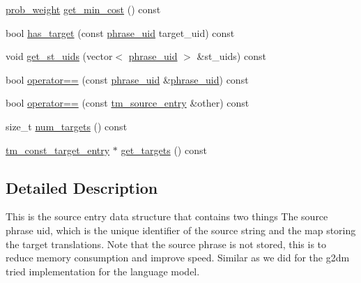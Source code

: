 \begin{DoxyCompactItemize}
\hyperlink{namespaceuva_1_1smt_1_1bpbd_1_1server_a01e9ea4de9c226f4464862e84ff0bbcc}{prob\+\_\+weight} \hyperlink{classuva_1_1smt_1_1bpbd_1_1server_1_1tm_1_1models_1_1tm__source__entry_aadb4fff504fa475f6df4b1c4f83307b4}{get\+\_\+min\+\_\+cost} () const 
\item 
bool \hyperlink{classuva_1_1smt_1_1bpbd_1_1server_1_1tm_1_1models_1_1tm__source__entry_af925b6e80ec88b3784bfd4b3971a8c3c}{has\+\_\+target} (const \hyperlink{namespaceuva_1_1smt_1_1bpbd_1_1server_ad18d4cdf5504e76c22b0c124ff60b44f}{phrase\+\_\+uid} target\+\_\+uid) const 
\item 
void \hyperlink{classuva_1_1smt_1_1bpbd_1_1server_1_1tm_1_1models_1_1tm__source__entry_a4a5576d63e82ad041cabcafa43b8b05e}{get\+\_\+st\+\_\+uids} (vector$<$ \hyperlink{namespaceuva_1_1smt_1_1bpbd_1_1server_ad18d4cdf5504e76c22b0c124ff60b44f}{phrase\+\_\+uid} $>$ \&st\+\_\+uids) const 
\item 
bool \hyperlink{classuva_1_1smt_1_1bpbd_1_1server_1_1tm_1_1models_1_1tm__source__entry_a3766d5c745e57da5e1e8bc99499fd182}{operator==} (const \hyperlink{namespaceuva_1_1smt_1_1bpbd_1_1server_ad18d4cdf5504e76c22b0c124ff60b44f}{phrase\+\_\+uid} \&\hyperlink{namespaceuva_1_1smt_1_1bpbd_1_1server_ad18d4cdf5504e76c22b0c124ff60b44f}{phrase\+\_\+uid}) const 
\item 
bool \hyperlink{classuva_1_1smt_1_1bpbd_1_1server_1_1tm_1_1models_1_1tm__source__entry_a98904c9803bb2e2c74575acf7612443d}{operator==} (const \hyperlink{classuva_1_1smt_1_1bpbd_1_1server_1_1tm_1_1models_1_1tm__source__entry}{tm\+\_\+source\+\_\+entry} \&other) const 
\item 
size\+\_\+t \hyperlink{classuva_1_1smt_1_1bpbd_1_1server_1_1tm_1_1models_1_1tm__source__entry_aea5362e08c0e2973d37a7a274557c9d3}{num\+\_\+targets} () const 
\item 
\hyperlink{namespaceuva_1_1smt_1_1bpbd_1_1server_1_1tm_1_1models_ae043b2a8672e39fe61239f7f1ece86ab}{tm\+\_\+const\+\_\+target\+\_\+entry} $\ast$ \hyperlink{classuva_1_1smt_1_1bpbd_1_1server_1_1tm_1_1models_1_1tm__source__entry_aea1cde8107adf8d9513f6a936e2b293e}{get\+\_\+targets} () const 
\end{DoxyCompactItemize}


\subsection{Detailed Description}
This is the source entry data structure that contains two things The source phrase uid, which is the unique identifier of the source string and the map storing the target translations. Note that the source phrase is not stored, this is to reduce memory consumption and improve speed. Similar as we did for the g2dm tried implementation for the language model. 

